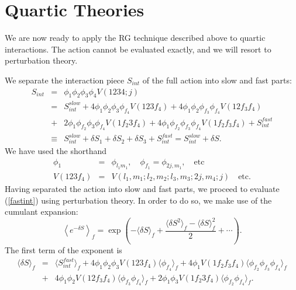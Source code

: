 \documentclass[a4paper,12pt]{article}
\numberwithin{equation}{section}
\begin{document}
\section{Quartic Theories}

We are now ready to apply the RG technique described above to quartic
interactions. The action cannot be evaluated exactly, and we will
resort to perturbation theory.

We separate the interaction piece $S_{int}$ of the full action into
slow and fast parts:
\begin{eqnarray}   
S_{int} &=& \phi_1 \phi_2 \phi_3 \phi_4 V(1234;j)  \nonumber \\
&=& S^{slow}_{int} + 4 \phi_1 \phi_2 \phi_3 \phi_{f_4} V(123f_4) + 4
\phi_1 \phi_2 \phi_{f_3} \phi_{f_4} V(12f_3 f_4)  \nonumber \\ 
&+& 2 \phi_1 \phi_{f_2} \phi_3 \phi_{f_4} V(1 f_2 3 f_4)+  4 \phi_1
\phi_{f_2} \phi_{f_3} \phi_{f_4} V(1 f_2 f_3 f_4) + S^{fast}_{int}
\nonumber \\ 
&\equiv&S^{slow}_{int} + \delta S_1 + \delta S_2 + \delta S_3
+S^{fast}_{int} = S^{slow}_{int} + \delta S.   
\end{eqnarray}
We have used the shorthand 
\begin{eqnarray} 
\phi_1 &=& \phi_{l_1 m_1}, \quad \phi_{f_1} = \phi_{2j,m_1}, \quad
\text{etc}\nonumber \\ 
V(123f_4) &=& V(l_1,m_1;l_2,m_2;l_3,m_3;2j,m_4;j) \quad \text{etc}. \nonumber 
\end{eqnarray} 
Having separated the action into slow and fast parts, we proceed to
evaluate (\ref{fastint}) using perturbation theory. In order to do so,
we make use of the cumulant expansion:
\begin{equation} 
\left \langle e^{-\delta S} \right \rangle_f = \exp{\left(-\langle \delta S
\rangle_f + \frac{\langle \delta S^2 \rangle_f - \langle \delta S
\rangle_f^2}{2} + \cdots \right)}.
\label{cumulant}
\end{equation}
The first term of the exponent is 
\begin{eqnarray}     	
\langle \delta S \rangle_f &=& \langle S^{fast}_{int}\rangle_f + 4
\phi_1 \phi_2 \phi_3 V(123f_4)\langle \phi_{f_4} \rangle_f + 4
\phi_1V(1 f_2 f_3 f_4) \langle \phi_{f_2} \phi_{f_3} \phi_{f_4}
\rangle_f  \nonumber \\ 
&+& 4 \phi_1 \phi_2 V(12f_3 f_4) \langle \phi_{f_3} \phi_{f_4} \rangle_f +
2 \phi_1 \phi_3 V(1 f_2 3 f_4) \langle \phi_{f_2} \phi_{f_4} \rangle_f. 
\end{eqnarray} 
\end{document}
